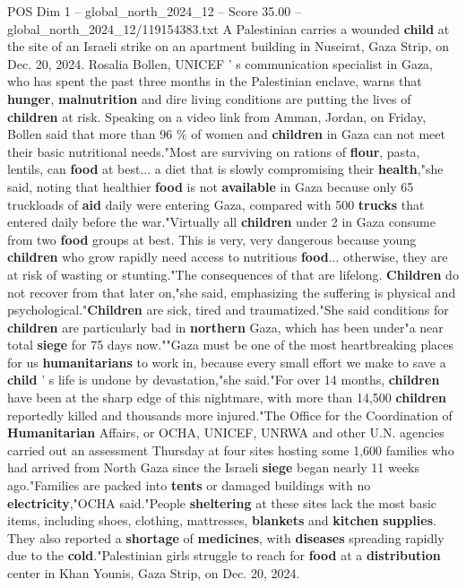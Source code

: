 \begin{textsample}{POS Dim 1 – global\_north\_2024\_12 – Score 35.00 – global\_north\_2024\_12/119154383.txt}
A Palestinian carries a wounded \textbf{child} at the site of an Israeli strike on an apartment building in Nuseirat, Gaza Strip, on Dec. 20, 2024.
Rosalia Bollen, UNICEF ' s communication specialist in Gaza, who has spent the past three months in the Palestinian enclave, warns that \textbf{hunger}, \textbf{malnutrition} and dire living conditions are putting the lives of \textbf{children} at risk.
Speaking on a video link from Amman, Jordan, on Friday, Bollen said that more than 96 \% of women and \textbf{children} in Gaza can not meet their basic nutritional needs."Most are surviving on rations of \textbf{flour}, pasta, lentils, can \textbf{food} at best... a diet that is slowly compromising their \textbf{health},"she said, noting that healthier \textbf{food} is not \textbf{available} in Gaza because only 65 truckloads of \textbf{aid} daily were entering Gaza, compared with 500 \textbf{trucks} that entered daily before the war."Virtually all \textbf{children} under 2 in Gaza consume from two \textbf{food} groups at best.
This is very, very dangerous because young \textbf{children} who grow rapidly need access to nutritious \textbf{food}... otherwise, they are at risk of wasting or stunting."The consequences of that are lifelong. \textbf{Children} do not recover from that later on,"she said, emphasizing the suffering is physical and psychological."\textbf{Children} are sick, tired and traumatized."She said conditions for \textbf{children} are particularly bad in \textbf{northern} Gaza, which has been under"a near total \textbf{siege} for 75 days now.""Gaza must be one of the most heartbreaking places for us \textbf{humanitarians} to work in, because every small effort we make to save a \textbf{child} ' s life is undone by devastation,"she said."For over 14 months, \textbf{children} have been at the sharp edge of this nightmare, with more than 14,500 \textbf{children} reportedly killed and thousands more injured."The Office for the Coordination of \textbf{Humanitarian} Affairs, or OCHA, UNICEF, UNRWA and other U.N. agencies carried out an assessment Thursday at four sites hosting some 1,600 families who had arrived from North Gaza since the Israeli \textbf{siege} began nearly 11 weeks ago."Families are packed into \textbf{tents} or damaged buildings with no \textbf{electricity},"OCHA said."People \textbf{sheltering} at these sites lack the most basic items, including shoes, clothing, mattresses, \textbf{blankets} and \textbf{kitchen} \textbf{supplies}.
They also reported a \textbf{shortage} of \textbf{medicines}, with \textbf{diseases} spreading rapidly due to the \textbf{cold}."Palestinian girls struggle to reach for \textbf{food} at a \textbf{distribution} center in Khan Younis, Gaza Strip, on Dec. 20, 2024.

\end{textsample}
